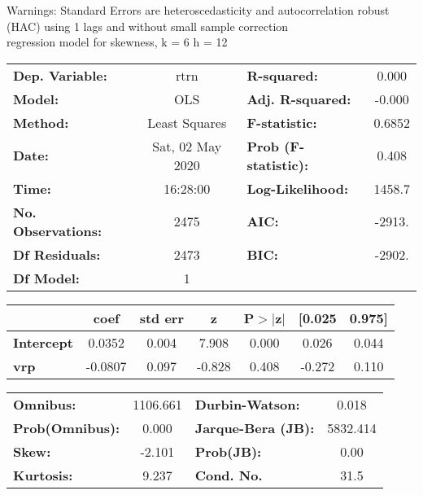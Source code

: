 Warnings: \newline
 [1] Standard Errors are heteroscedasticity and autocorrelation robust (HAC) using 1 lags and without small sample correction\\ 

regression model for skewness, k = 6 h = 12\begin{center}
\begin{tabular}{lclc}
\toprule
\textbf{Dep. Variable:}    &       rtrn       & \textbf{  R-squared:         } &     0.000   \\
\textbf{Model:}            &       OLS        & \textbf{  Adj. R-squared:    } &    -0.000   \\
\textbf{Method:}           &  Least Squares   & \textbf{  F-statistic:       } &    0.6852   \\
\textbf{Date:}             & Sat, 02 May 2020 & \textbf{  Prob (F-statistic):} &    0.408    \\
\textbf{Time:}             &     16:28:00     & \textbf{  Log-Likelihood:    } &    1458.7   \\
\textbf{No. Observations:} &        2475      & \textbf{  AIC:               } &    -2913.   \\
\textbf{Df Residuals:}     &        2473      & \textbf{  BIC:               } &    -2902.   \\
\textbf{Df Model:}         &           1      & \textbf{                     } &             \\
\bottomrule
\end{tabular}
\begin{tabular}{lcccccc}
                   & \textbf{coef} & \textbf{std err} & \textbf{z} & \textbf{P$> |$z$|$} & \textbf{[0.025} & \textbf{0.975]}  \\
\midrule
\textbf{Intercept} &       0.0352  &        0.004     &     7.908  &         0.000        &        0.026    &        0.044     \\
\textbf{vrp}       &      -0.0807  &        0.097     &    -0.828  &         0.408        &       -0.272    &        0.110     \\
\bottomrule
\end{tabular}
\begin{tabular}{lclc}
\textbf{Omnibus:}       & 1106.661 & \textbf{  Durbin-Watson:     } &    0.018  \\
\textbf{Prob(Omnibus):} &   0.000  & \textbf{  Jarque-Bera (JB):  } & 5832.414  \\
\textbf{Skew:}          &  -2.101  & \textbf{  Prob(JB):          } &     0.00  \\
\textbf{Kurtosis:}      &   9.237  & \textbf{  Cond. No.          } &     31.5  \\
\bottomrule
\end{tabular}
\end{center}

